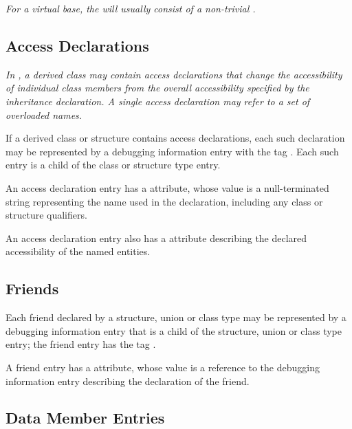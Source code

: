 {\textit{For a  virtual base, the 
will usually consist of a non-trivial 
.}

\subsection{Access Declarations}
\label{chap:accessdeclarations}

\textit{In , a derived class may contain access declarations that
change the accessibility of individual class members from the
overall accessibility specified by the inheritance declaration.
A single access declaration may refer to a set of overloaded
names.}

If a derived class or structure contains access declarations,
each such declaration may be represented by a debugging
information entry with the tag \DWTAGaccessdeclarationTARG.
Each such entry is a child of the class or structure type entry.

An access declaration entry has a \DWATname{} attribute, 
whose value is a null-terminated string representing the name 
used in the declaration,
including any class or structure qualifiers.

An\hypertarget{chap:DWATaccessdeclaration}{} 
access declaration entry also has a
\hyperlink{chap:DWATaccessibilityattribute}{\DWATaccessibilityNAME}
attribute describing the declared accessibility of the named entities.


\subsection{Friends}
\label{chap:friends}

Each\hypertarget{chap:DWATfriendfriendrelationship}{} 
friend
declared by a structure, union or class
type may be represented by a debugging information entry
that is a child of the structure, union or class type entry;
the friend entry has the tag \DWTAGfriendTARG.

A friend entry has a \DWATfriendDEFN{} attribute,
 whose value is
a reference to the debugging information entry describing
the declaration of the friend.


\subsection{Data Member Entries}
\label{chap:datamemberentries}

}
